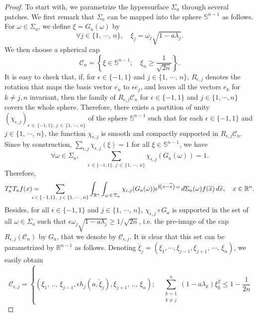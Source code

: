 \documentclass[10pt]{amsart}
\theoremstyle{definition}\newtheorem{defi}[theo]{Definition}\newtheorem{rema}[theo]{Remark}\newtheorem{exam}[theo]{Example}\newtheorem{exem}[theo]{Example}\newtheorem{nota}[theo]{Notation}
\newcommand{\scC}{\mathscr{C}}
\newcommand*\R{\mathbb{R}}
\renewcommand*\S{\mathbb{S}}
\renewcommand{\i}{\mathbf{i}}
\renewcommand{\leq}{\leqslant}
\renewcommand{\geq}{\geqslant}
\renewcommand{\tilde}{\widetilde}
\let\oldtilde\tilde
\renewcommand*{\tilde}[1]{\mathchoice{\widetilde{#1}}{\widetilde{#1}}{\oldtilde{#1}}{\oldtilde{#1}}}
\let\oldforall\forall
\renewcommand*{\forall}{\mathrel{\oldforall}}
\begin{document}
\begin{proof}
To start with, we parametrize the hypersurface $\Sigma_{a}$ through several patches. We first remark that $\Sigma_a$ can be mapped into the sphere $\S^{n-1}$ as follows. For $\omega \in \Sigma_a$, we define $\xi = G_a(\omega)$ by
\[
\forall j \in \{1,\,\cdots,\,n\}, \quad \xi_j = \omega_j \sqrt{1 - a \lambda_j}.
\]
We then choose a spherical cap
\[
\scC_n =
\left\{
\xi \in \S^{n-1}; \quad \xi_n \geq \frac{1}{\sqrt{2n}}
\right\}.
\]
It is easy to check that, if, for $\epsilon \in \{-1,1\}$ and $j \in \{1,\,\cdots,\,n\}$, $R_{\epsilon, j}$ denotes the rotation that maps the basis vector $e_n$ to $\epsilon e_j$, and leaves all the vectors $e_k$ for $k \neq j,n$ invariant, then the family of $R_{\epsilon,j} \scC_n$ for $\epsilon \in \{-1,1\}$ and $j \in \{1,\cdots, n\} $ covers the whole sphere. Therefore, there exists a partition of unity $(\chi_{\epsilon, j})_{\epsilon\, \in\,\{-1,1\},\,j\,\in\,\{1,\,\cdots,\, n\}}$ of the sphere $\S^{n-1}$ such that for each $\epsilon \in \{-1,1\}$ and $j \in \{1,\,\cdots,\,n\} $, the function $\chi_{\epsilon, j}$ is smooth and compactly supported in $R_{\epsilon,j} \scC_n$. Since by construction, $\sum_{\epsilon,j} \chi_{\epsilon,j} (\xi) = 1$ for all $\xi \in \S^{n-1}$, we have
\[
\forall \omega \in \Sigma_a,
\quad
\sum_{\epsilon\,\in \{-1,1\}, \, j\,\in\,\{1,\, \cdots,\,n\} } \chi_{\epsilon,j} (G_a(\omega)) = 1.
\]
Therefore,
\begin{equation*}
T^\star _{a}T_{a} f(x) =\mkern-25mu
\sum_{\epsilon\,\in\,\{-1,1\}, \ j\,\in\,\{1,\, \cdots,\,n\} }
\int_{\R^{n}}
\int_{ {\omega}\,\in\,\Sigma_{a} }
\chi_{\epsilon,j} (G_a(\omega)) e^{\i \left(x-\tilde{x}\right) \cdot {\omega}}
\, d \Sigma_{a}({\omega}) f(\tilde{x})
\, d \tilde{x},
\quad x \in \R^n.
\end{equation*}
Besides, for all $\epsilon \in \{-1,1\}$ and $j\in \{1,\,\cdots,\,n\}$, $\chi_{\epsilon,j}\circ G_a$ is supported in the set of all $\omega \in \Sigma_{a}$ such that $\epsilon \omega_{j}\sqrt{1 - a \lambda_j} \geq 1/\sqrt{2n}$, i.e. the pre-image of the cap $R_{\epsilon,j} (\scC_n)$ by $G_a$, that we denote by $\scC_{\epsilon,j}$. It is clear that this set can be parametrized by $\R^{n-1}$ as follows. Denoting $\check\xi_j = (\xi_1, \cdots, \xi_{j-1}, \xi_{j+1},\,\cdots,\,\xi_n)$, we easily obtain
\begin{equation*}
\scC_{\epsilon,j} =
\left\{
\left(\xi_1,\,..,\,\xi_{j-1}, \epsilon h_{j}\left(a, \check\xi_j\right), \xi_{j+1},\,..,\,\xi_n \right);
\quad
\sum_{\substack{k=1 \\ k \neq j}}^{n} (1-a \lambda_{k}) \xi_k^2 \leq 1- \frac{1}{2n}

\end{equation*}
\end{proof}
\end{document}
